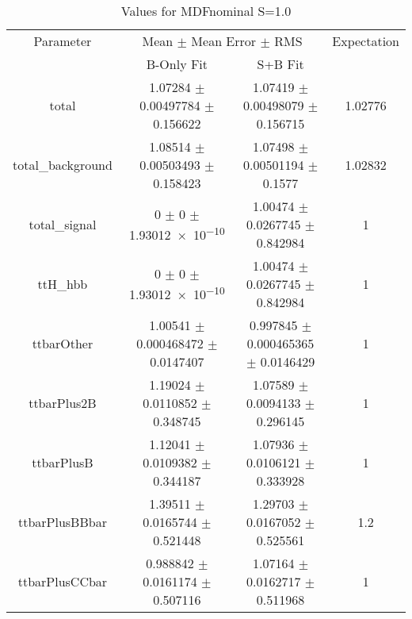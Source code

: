 \begin{table}
\centering
\caption{Values for MDFnominal S=1.0}
\begin{tabular}{cccc}
\toprule
Parameter & \multicolumn{2}{c}{Mean $\pm$ Mean Error $\pm$ RMS} & Expectation\\
 & B-Only Fit & S+B Fit & \\
\midrule
total & \num{1.07284} $\pm$ \num{0.00497784} $\pm$ \num{0.156622} & \num{1.07419} $\pm$ \num{0.00498079} $\pm$ \num{0.156715} & \num{1.02776}\\
total\_background & \num{1.08514} $\pm$ \num{0.00503493} $\pm$ \num{0.158423} & \num{1.07498} $\pm$ \num{0.00501194} $\pm$ \num{0.1577} & \num{1.02832}\\
total\_signal & \num{0} $\pm$ \num{0} $\pm$ \num{1.93012e-10} & \num{1.00474} $\pm$ \num{0.0267745} $\pm$ \num{0.842984} & \num{1}\\
ttH\_hbb & \num{0} $\pm$ \num{0} $\pm$ \num{1.93012e-10} & \num{1.00474} $\pm$ \num{0.0267745} $\pm$ \num{0.842984} & \num{1}\\
ttbarOther & \num{1.00541} $\pm$ \num{0.000468472} $\pm$ \num{0.0147407} & \num{0.997845} $\pm$ \num{0.000465365} $\pm$ \num{0.0146429} & \num{1}\\
ttbarPlus2B & \num{1.19024} $\pm$ \num{0.0110852} $\pm$ \num{0.348745} & \num{1.07589} $\pm$ \num{0.0094133} $\pm$ \num{0.296145} & \num{1}\\
ttbarPlusB & \num{1.12041} $\pm$ \num{0.0109382} $\pm$ \num{0.344187} & \num{1.07936} $\pm$ \num{0.0106121} $\pm$ \num{0.333928} & \num{1}\\
ttbarPlusBBbar & \num{1.39511} $\pm$ \num{0.0165744} $\pm$ \num{0.521448} & \num{1.29703} $\pm$ \num{0.0167052} $\pm$ \num{0.525561} & \num{1.2}\\
ttbarPlusCCbar & \num{0.988842} $\pm$ \num{0.0161174} $\pm$ \num{0.507116} & \num{1.07164} $\pm$ \num{0.0162717} $\pm$ \num{0.511968} & \num{1}\\
\bottomrule
\end{tabular}
\end{table}